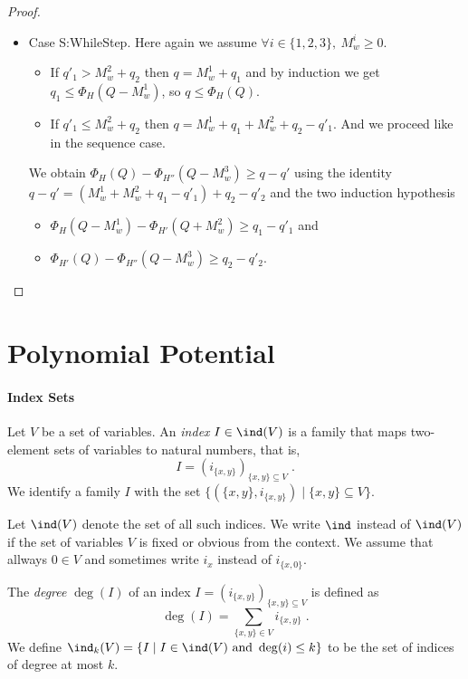 \documentclass[10pt]{article}
\theoremstyle{newstyle}
\begin{document}
\begin{proof}
\begin{itemize}
\item Case {\sc S:WhileStep}.
  Here again we assume $\forall i \in \{1, 2, 3\},~M_w^i \ge 0$.
  \begin{itemize}[topsep=0pt]
  \item
    If $q'_1 > M_w^2 + q_2$ then $q = M_w^1 + q_1$ and by induction
    we get $q_1 \le \Phi_H(Q - M_w^1)$, so $q \le \Phi_H(Q)$.
  \item
    If $q'_1 \le M_w^2 + q_2$ then $q = M_w^1 + q_1 + M_w^2 + q_2 - q'_1$.
    And we proceed like in the sequence case.
  \end{itemize}
  We obtain $\Phi_H(Q) - \Phi_{H''}(Q - M_w^3) \ge q - q'$ using the identity
  $q - q' = (M_w^1 + M_w^2 + q_1 - q'_1) + q_2 - q'_2$ and the two
  induction hypothesis
  \begin{itemize}[topsep=0pt]
  \item $\Phi_H(Q - M_w^1) - \Phi_{H'}(Q + M_w^2) \ge q_1 - q'_1$ and
  \item $\Phi_{H'}(Q) - \Phi_{H''}(Q - M_w^3) \ge q_2 - q'_2.$
  \end{itemize}

\end{itemize}
\end{proof}

\section{Polynomial Potential}

\paragraph{Index Sets}

Let $V$ be a set of variables.  An \emph{index} $I \in \ind(V)$ is a
family that maps two-element sets of variables to natural numbers,
that is,
$$
I = (i_{\{x,y\}})_{\{x,y\} \subseteq V} \; .
$$
%
We identify a family $I$ with the set $\{ (\{x,y\},i_{\{x,y\}})
\mid \{x,y\} \subseteq V\}$.

Let $\ind(V)$ denote the set of all such indices.  We write $\ind$
instead of $\ind(V)$ if the set of variables $V$ is fixed or obvious
from the context.
%
We assume that allways $0 \in V$ and sometimes write $i_x$ instead of $i_{\{x,0\}}$.

The \emph{degree} $\deg(I)$ of an index $I = (i_{\{x,y\}})_{\{x,y\}
  \subseteq V}$ is defined as
$$
\deg(I) = \sum_{\{x,y\} \in V} i_{\{x,y\}} \;.
$$
We define $\ind_k(V) = \{ I \mid I \in \ind(V) \text{ and } \deg(i) \leq k
\}$ to be the set of indices of degree at most $k$.
\end{document}
